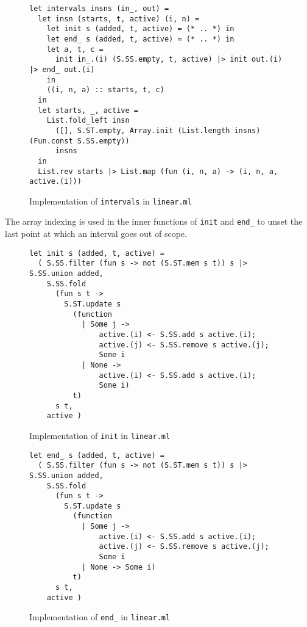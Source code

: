 \documentclass{article}
\begin{document}
\begin{figure}[H]
     \centering
     \begin{verbatim}
let intervals insns (in_, out) =
  let insn (starts, t, active) (i, n) =
    let init s (added, t, active) = (* .. *) in
    let end_ s (added, t, active) = (* .. *) in
    let a, t, c =
      init in_.(i) (S.SS.empty, t, active) |> init out.(i) |> end_ out.(i)
    in
    ((i, n, a) :: starts, t, c)
  in
  let starts, _, active =
    List.fold_left insn
      ([], S.ST.empty, Array.init (List.length insns) (Fun.const S.SS.empty))
      insns
  in
  List.rev starts |> List.map (fun (i, n, a) -> (i, n, a, active.(i)))
     \end{verbatim}
     \caption{Implementation of \texttt{intervals} in \texttt{linear.ml}}\label{fig:intervals-ocaml}
\end{figure}

\noindent The array indexing is used in the inner functions of \texttt{init} and \texttt{end\_} to unset the last point at which an interval goes out of scope.

\begin{figure}[H]
     \centering
     \begin{verbatim}
let init s (added, t, active) =
  ( S.SS.filter (fun s -> not (S.ST.mem s t)) s |> S.SS.union added,
    S.SS.fold
      (fun s t ->
        S.ST.update s
          (function
            | Some j ->
                active.(i) <- S.SS.add s active.(i);
                active.(j) <- S.SS.remove s active.(j);
                Some i
            | None ->
                active.(i) <- S.SS.add s active.(i);
                Some i)
          t)
      s t,
    active )
     \end{verbatim}
     \caption{Implementation of \texttt{init} in \texttt{linear.ml}}\label{fig:init-ocaml}
\end{figure}

\begin{figure}[H]
     \centering
     \begin{verbatim}
let end_ s (added, t, active) =
  ( S.SS.filter (fun s -> not (S.ST.mem s t)) s |> S.SS.union added,
    S.SS.fold
      (fun s t ->
        S.ST.update s
          (function
            | Some j ->
                active.(i) <- S.SS.add s active.(i);
                active.(j) <- S.SS.remove s active.(j);
                Some i
            | None -> Some i)
          t)
      s t,
    active )
     \end{verbatim}
     \caption{Implementation of \texttt{end\_} in \texttt{linear.ml}}\label{fig:end_-ocaml}
\end{figure}
\end{document}
